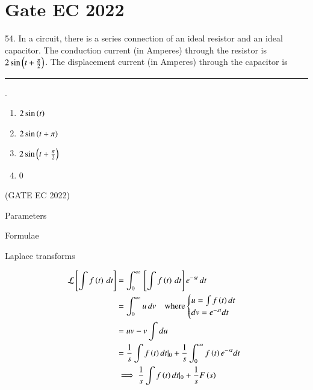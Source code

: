 \documentclass[journal,12pt,twocolumn]{IEEEtran}
\begin{document}


\vspace{3cm}

\title{}
\author{EE23BTECH11054 -  Sai Krishna Shanigarapu$^{*}$
}
\maketitle
\newpage
\bigskip


\section*{Gate EC 2022}
54. \hspace{2pt}In a circuit, there is a series connection of an ideal resistor and an ideal capacitor.
The conduction current (in Amperes) through the resistor is $2\sin\left(t + \frac{\pi}{2}\right)$. The displacement current (in Amperes) through the capacitor is \rule{1cm}{0.15mm}.\\ 
\begin{enumerate}[label=(\Alph*)]
    \item $2\sin\left(t\right)$
    \item $2\sin\left(t+\pi\right)$
    \item $2\sin\left(t +\frac{\pi}{2}\right)$
    \item $0$
\end{enumerate}
\hfill(GATE EC 2022)

\solution
\fi
\begin{table}[ht]
       
    \caption{Parameters}
    \label{tab:tab_gate_ec_2022_24_1}
\end{table}


\begin{table}[ht]
       
    \caption{Formulae}
    \label{tab:tab_gate_ec_2022_24_2}
\end{table}

\begin{table}[ht]
       
    \caption{Laplace transforms}
    \label{tab:tab_gate_ec_2022_24_3}
\end{table}

\begin{align}
    \mathcal{L}{}\left[\int f\left(t\right)\, dt\right] &= \int_{0}^{\infty}{}\left[\int f\left(t\right)\, dt\right]e^{-st}\, dt\\
    &= \int_{0}^{\infty}u\, dv \quad \text{where}\begin{cases}
  u =\int f\left(t\right)dt \\
  dv  =e^{-st}dt
\end{cases}\\
&= uv - v\int du\\
&= \frac{1}{s}\int f\left(t\right)dt|_0 + \frac{1}{s}\int_{0}^{\infty}f\left(t\right)e^{-st}dt\\
&\implies \frac{1}{s}\int f\left(t\right)dt|_0 + \frac{1}{s}F\left(s\right) \label{eq:eq_gate_ec_2022_24_1}
\end{align}
\end{document}
